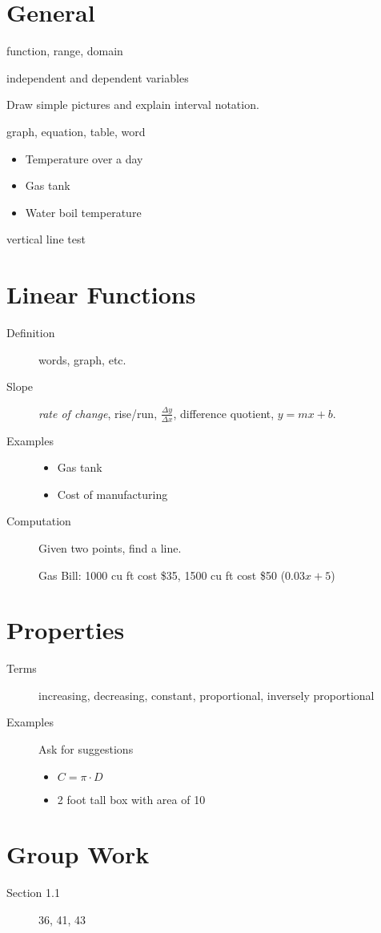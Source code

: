 \documentclass[11pt]{article}
\begin{document}
\drawtitle

\section*{General}
\begin{description}
\item[Definitions] function, range, domain
\item independent and dependent variables
\item Draw simple pictures and explain interval notation.
\item[Examples] graph, equation, table, word
  \begin{itemize}
  \item Temperature over a day
  \item Gas tank
  \item Water boil temperature
  \end{itemize}
\item[Check] vertical line test
\end{description}

\section*{Linear Functions}
\begin{description}
\item[Definition] words, graph, etc.
\item[Slope] \textit{rate of change}, rise/run, $\frac{\Delta
    y}{\Delta x}$, difference quotient, $y=mx+b$.
\item[Examples]
  \begin{itemize}
  \item Gas tank
  \item Cost of manufacturing
  \end{itemize}
\item[Computation] Given two points, find a line.

Gas Bill: 1000 cu ft cost \$35, 1500 cu ft cost \$50 ($0.03x+5$)

\end{description}

\section*{Properties}
\begin{description}
\item[Terms] increasing, decreasing, constant, proportional, inversely
  proportional
\item[Examples] Ask for suggestions
  \begin{itemize}
  \item $C=\pi\cdot D$
  \item 2 foot tall box with area of 10
  \end{itemize}
\end{description}

\section*{Group Work}
\begin{description}
\item[Section 1.1] 36, 41, 43
\end{description}
\end{document}
